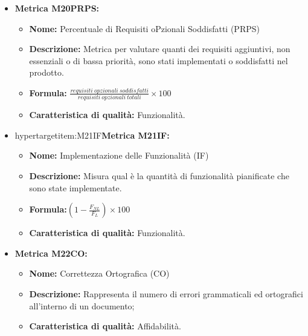 \begin{itemize}
    \item \hypertarget{item:M20PRPS}{\textbf{Metrica M20PRPS:}}
    \begin{minipage}[t]{0.9\textwidth}
        \begin{itemize}
            \item \textbf{Nome:} Percentuale di Requisiti oPzionali Soddisfatti (PRPS)
            \item \textbf{Descrizione:} Metrica per valutare quanti dei requisiti aggiuntivi, non essenziali o di bassa priorità, sono stati implementati o soddisfatti nel prodotto.
            \item \textbf{Formula:} $\frac{requisiti \ opzionali \ soddisfatti}{requisiti \ opzionali \ totali}\times 100$
            \item \textbf{Caratteristica di qualità:} Funzionalità.
        \end{itemize}
    \end{minipage}

    \item hypertarget{item:M21IF}{\textbf{Metrica M21IF:}}
    \begin{minipage}[t]{0.9\textwidth}
                  \begin{itemize}
                      \item \textbf{Nome:} Implementazione delle Funzionalità (IF)
                      \item \textbf{Descrizione:} Misura qual è la quantità di funzionalità pianificate che sono state implementate.
                      \item \textbf{Formula:}$(1 - \frac{F_{NL}}{F_L}) \times 100$
                      \item \textbf{Caratteristica di qualità:} Funzionalità.
                  \end{itemize}
                \end{minipage}

    \item \hypertarget{item:M22CO}{\textbf{Metrica M22CO:}}
    \begin{minipage}[t]{0.9\textwidth}
          \begin{itemize}
              \item \textbf{Nome:} Correttezza Ortografica (CO)
              \item \textbf{Descrizione:} Rappresenta il numero di errori grammaticali ed
              ortografici all'interno di un documento;
              \item \textbf{Caratteristica di qualità:} Affidabilità.
          \end{itemize}
        \end{minipage}


\end{itemize}
